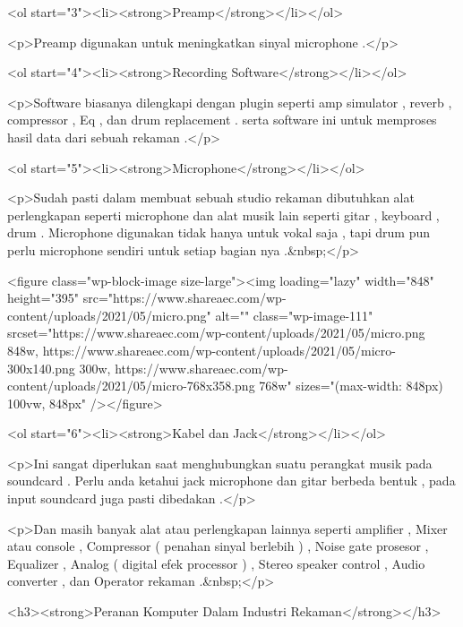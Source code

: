 <ol start="3"><li><strong>Preamp</strong></li></ol>



<p>Preamp digunakan untuk meningkatkan sinyal microphone .</p>



<ol start="4"><li><strong>Recording Software</strong></li></ol>



<p>Software biasanya dilengkapi dengan plugin seperti amp simulator , reverb , compressor , Eq , dan drum replacement . serta software ini untuk memproses hasil data dari sebuah rekaman .</p>



<ol start="5"><li><strong>Microphone</strong></li></ol>



<p>Sudah pasti dalam membuat sebuah studio rekaman dibutuhkan alat perlengkapan seperti microphone dan alat musik lain seperti gitar , keyboard , drum . Microphone digunakan tidak hanya untuk vokal saja , tapi drum pun perlu microphone sendiri untuk setiap bagian nya .&nbsp;</p>



<figure class="wp-block-image size-large"><img loading="lazy" width="848" height="395" src="https://www.shareaec.com/wp-content/uploads/2021/05/micro.png" alt="" class="wp-image-111" srcset="https://www.shareaec.com/wp-content/uploads/2021/05/micro.png 848w, https://www.shareaec.com/wp-content/uploads/2021/05/micro-300x140.png 300w, https://www.shareaec.com/wp-content/uploads/2021/05/micro-768x358.png 768w" sizes="(max-width: 848px) 100vw, 848px" /></figure>



<ol start="6"><li><strong>Kabel dan Jack</strong></li></ol>



<p>Ini sangat diperlukan saat menghubungkan suatu perangkat musik pada soundcard . Perlu anda ketahui jack microphone dan gitar berbeda bentuk , pada input soundcard juga pasti dibedakan .</p>



<p>Dan masih banyak alat atau perlengkapan lainnya seperti amplifier , Mixer atau console , Compressor ( penahan sinyal berlebih ) , Noise gate prosesor , Equalizer , Analog ( digital efek processor ) , Stereo speaker control , Audio converter , dan Operator rekaman .&nbsp;</p>



<h3><strong>Peranan Komputer Dalam Industri Rekaman</strong></h3>



